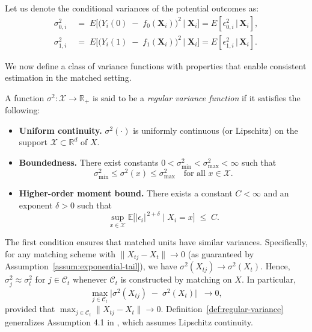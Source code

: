 \documentclass{mytemplate}
\begin{document}
Let us denote the conditional variances of the potential outcomes as:
\begin{equation}
\label{eq:equal-var}
\begin{aligned}
\sigma_{0,i}^2 
&\;=\; 
E\bigl[\bigl(Y_i(0) \;-\; f_0(\mathbf{X}_i)\bigr)^2 \,\big|\; \mathbf{X}_i\bigr] = E[\epsilon_{0,i}^2 \,|\, \mathbf{X}_i], \\
\sigma_{1,i}^2 
&\;=\; 
E\bigl[\bigl(Y_i(1) \;-\; f_1(\mathbf{X}_i)\bigr)^2 \,\big|\; \mathbf{X}_i\bigr] = E[\epsilon_{1,i}^2 \,|\, \mathbf{X}_i].
\end{aligned}
\end{equation}

We now define a class of variance functions with properties that enable consistent estimation in the matched setting.

\begin{definition}
\label{def:regular-variance}
A function $\sigma^2 : \mathcal{X} \to \mathbb{R}_{+}$ is said to be a \textit{regular variance function} if it satisfies the following:

\begin{itemize}
    \item \textbf{Uniform continuity.} $\sigma^2(\cdot)$ is uniformly continuous (or Lipschitz) on the support $\mathcal{X} \subset \mathbb{R}^d$ of $X$.

    \item \textbf{Boundedness.} There exist constants $0 < \sigma^2_{\min} < \sigma^2_{\max} < \infty$ such that
    \[
    \sigma^2_{\min} \leq \sigma^2(x) \leq \sigma^2_{\max} \quad \text{for all } x \in \mathcal{X}.
    \]

    \item \textbf{Higher-order moment bound.} There exists a constant $C < \infty$ and an exponent $\delta > 0$ such that 
    \[
    \sup_{x \in \mathcal{X}}
    \mathbb{E}\bigl[\bigl|\epsilon_i\bigr|^{\,2+\delta} 
      \;\big|\; X_i = x
    \bigr] 
    \;\le\; C.
    \]
\end{itemize}
\end{definition}

The first condition ensures that matched units have similar variances. Specifically, for any matching scheme with \(\| X_{tj} - X_{t}\|\to 0\) (as guaranteed by Assumption~\ref{assum:exponential-tail}), we have \(\sigma^2(X_{tj}) \to \sigma^2(X_{t})\). Hence, \(\sigma_j^2 \approx \sigma_t^2\) for \(j \in \mathcal{C}_t\) whenever \(\mathcal{C}_t\) is constructed by matching on \(X\). In particular,
\[
\max_{j \in \mathcal{C}_t}
\bigl|\sigma^2(X_{tj}) \;-\; \sigma^2(X_{t})\bigr|
\;\;\xrightarrow[]{} 0,
\]
provided that 
\(\max_{j \in \mathcal{C}_t} \|X_{tj} - X_{t}\| \to 0\).  
Definition~\ref{def:regular-variance} generalizes Assumption 4.1 in \cite{abadie2006large}, which assumes Lipschitz continuity.
\end{document}
